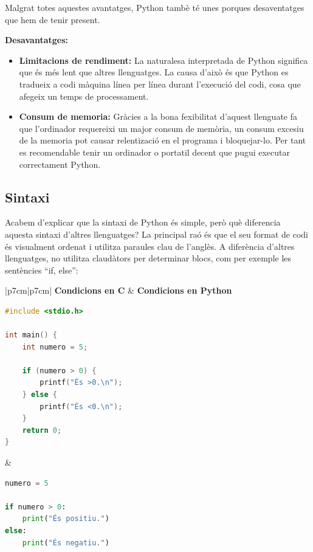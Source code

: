 Malgrat totes aquestes avantatges, Python tambè té unes porques desaventatges que hem de tenir present.

\textbf{Desavantatges:}
\begin{itemize}
 \item \textbf{Limitacions de rendiment:} La naturalesa interpretada de Python significa que és més lent que altres llenguatges. La causa d'això és que Python es tradueix a codi màquina línea per línea durant l'execució del codi, cosa que afegeix un temps de processament.
 \item \textbf{Consum de memoria:} Gràcies a la bona fexibilitat d'aquest llenguate fa que l'ordinador requereixi un major consum de memòria, un consum excesiu de la memoria pot causar relentizació en el programa i bloquejar-lo. Per tant es recomendable tenir un ordinador o portatil decent que pugui executar correctament Python.
\end{itemize}

\subsection{Sintaxi}
Acabem d'explicar que la sintaxi de Python és simple, però què diferencia aquesta sintaxi d'altres llenguatges? La principal raó és que el seu format de codi és visualment ordenat i utilitza paraules clau de l'anglès. A diferència d'altres llenguatges, no utilitza claudàtors per determinar blocs, com per exemple les sentències ``if, else'':


\begin{table}[h!]
\centering
\begin{tabular}{|p{7cm}|p{7cm}|}
\hline
\textbf{Condicions en C} & \textbf{Condicions en Python} \\ \hline

\begin{minipage}[t]{\linewidth}
\begin{lstlisting}[language=C]
#include <stdio.h>

int main() {
    int numero = 5;

    if (numero > 0) {
        printf("És >0.\n");
    } else {
        printf("És <0.\n");
    }
    return 0;
}
\end{lstlisting}
\end{minipage}
&
\begin{minipage}[t]{\linewidth}
\begin{lstlisting}[language=Python]
numero = 5

if numero > 0:
    print("És positiu.")
else:
    print("És negatiu.")
\end{lstlisting}
\end{minipage}
\\ \hline
\end{tabular}
\caption{Comparació de condicions en C i Python}
\end{table}




